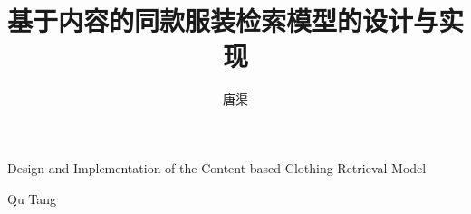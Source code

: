 \title{基于内容的同款服装检索模型的设计与实现}{}{Design and Implementation of the Content based Clothing Retrieval Model}{}
\author{唐渠}{Qu Tang}
\authorizedate{\today}
\makebigcover
\makecover

